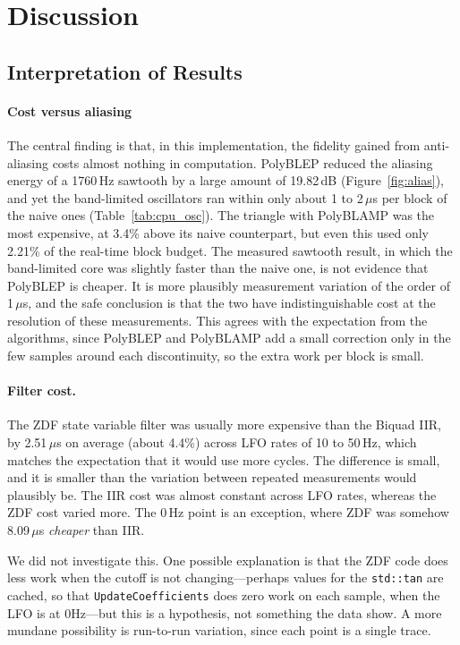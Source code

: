 \section{Discussion}

\subsection{Interpretation of Results}

\paragraph{Cost versus aliasing} The central finding is that, in this implementation, the fidelity gained from anti-aliasing costs almost nothing in computation. PolyBLEP reduced the aliasing energy of a 1760\,Hz sawtooth by a large amount of 19.82\,dB (Figure~\ref{fig:alias}), and yet the band-limited oscillators ran within only about 1 to 2\,$\mu$s per block of the naive ones (Table~\ref{tab:cpu_osc}). The triangle with PolyBLAMP was the most expensive, at 3.4\% above its naive counterpart, but even this used only 2.21\% of the real-time block budget. The measured sawtooth result, in which the band-limited core was slightly faster than the naive one, is not evidence that PolyBLEP is cheaper. It is more plausibly measurement variation of the order of 1\,$\mu$s, and the safe conclusion is that the two have indistinguishable cost at the resolution of these measurements. This agrees with the expectation from the algorithms, since PolyBLEP and PolyBLAMP add a small correction only in the few samples around each discontinuity, so the extra work per block is small\cite{PolyBLEP}\cite{PolyBLAMP}.

\paragraph{Filter cost.} The ZDF state variable filter was usually more expensive than the Biquad IIR, by 2.51\,$\mu$s on average (about 4.4\%) across LFO rates of 10 to 50\,Hz, which matches the expectation that it would use more cycles. The difference is small, and it is smaller than the variation between repeated measurements would plausibly be. The IIR cost was almost constant across LFO rates, whereas the ZDF cost varied more. The 0\,Hz point is an exception, where ZDF was somehow 8.09\,$\mu$s \emph{cheaper} than IIR. 

We did not investigate this. One possible explanation is that the ZDF code does less work when the cutoff is not changing---perhaps values for the \texttt{std::tan} are cached, so that \texttt{UpdateCoefficients} does zero work on each sample, when the LFO is at 0Hz---but this is a hypothesis, not something the data show. A more mundane possibility is run-to-run variation, since each point is a single trace.


